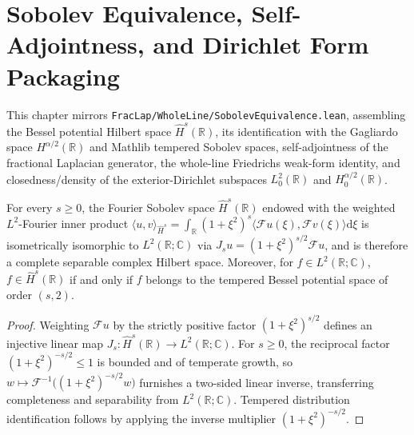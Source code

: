 \chapter{Sobolev Equivalence, Self-Adjointness, and Dirichlet Form Packaging}

This chapter mirrors \texttt{FracLap/WholeLine/SobolevEquivalence.lean}, assembling the Bessel potential Hilbert space $\widehat{H}^s(\mathbb{R})$, its identification with the Gagliardo space $H^{\alpha/2}(\mathbb{R})$ and Mathlib tempered Sobolev spaces, self-adjointness of the fractional Laplacian generator, the whole-line Friedrichs weak-form identity, and closedness/density of the exterior-Dirichlet subspaces $L^2_0(\mathbb{R})$ and $H^{\alpha/2}_0(\mathbb{R})$.

\begin{theorem}\label{thm:fracsobolevhilbert}
\leanok
For every $s \ge 0$, the Fourier Sobolev space $\widehat{H}^s(\mathbb{R})$ endowed with the weighted $L^2$-Fourier inner product $\langle u, v \rangle_{\widehat{H}^s} = \int_{\mathbb{R}} (1 + \xi^2)^s \langle \mathcal{F}u(\xi), \mathcal{F}v(\xi) \rangle \mathrm{d}\xi$ is isometrically isomorphic to $L^2(\mathbb{R}; \mathbb{C})$ via $J_s u = (1 + \xi^2)^{s/2} \mathcal{F}u$, and is therefore a complete separable complex Hilbert space. Moreover, for $f \in L^2(\mathbb{R}; \mathbb{C})$, $f \in \widehat{H}^s(\mathbb{R})$ if and only if $f$ belongs to the tempered Bessel potential space of order $(s, 2)$.
\end{theorem}

\begin{proof}
\leanok
Weighting $\mathcal{F}u$ by the strictly positive factor $(1 + \xi^2)^{s/2}$ defines an injective linear map $J_s : \widehat{H}^s(\mathbb{R}) \to L^2(\mathbb{R}; \mathbb{C})$. For $s \ge 0$, the reciprocal factor $(1 + \xi^2)^{-s/2} \le 1$ is bounded and of temperate growth, so $w \mapsto \mathcal{F}^{-1}\bigl((1 + \xi^2)^{-s/2} w\bigr)$ furnishes a two-sided linear inverse, transferring completeness and separability from $L^2(\mathbb{R}; \mathbb{C})$. Tempered distribution identification follows by applying the inverse multiplier $(1 + \xi^2)^{-s/2}$.
\end{proof}

